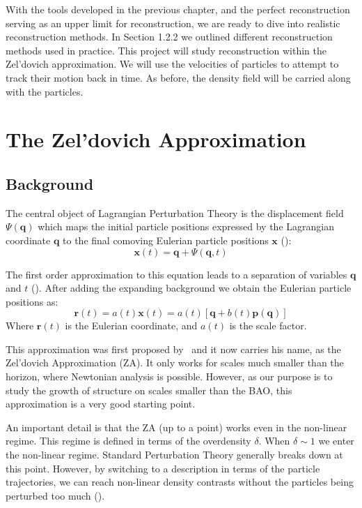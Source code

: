 
With the tools developed in the previous chapter, and the perfect reconstruction serving as an upper limit for reconstruction, we are ready to dive into realistic reconstruction methods. In Section 1.2.2 we outlined different reconstruction methods used in practice. This project will study reconstruction within the Zel'dovich approximation. We will use the velocities of particles to attempt to track their motion back in time. As before, the density field will be carried along with the particles.

\section{The Zel'dovich Approximation}

\subsection{Background}

The central object of Lagrangian Perturbation Theory is the displacement field $\Psi(\textbf{q})$ which maps the initial particle positions expressed by the Lagrangian coordinate $\textbf{q}$ to the final comoving Eulerian particle positions $\textbf{x}$ (\cite{Bernardeau_PT}):
\begin{equation}
     \textbf{x}(t) = \textbf{q} + \Psi(\textbf{q}, t)
\end{equation}

The first order approximation to this equation leads to a separation of variables $\textbf{q}$ and $t$ (\cite{1993sfu..book.....P}). After adding the expanding background we obtain the Eulerian particle positions as:
\begin{equation}
    \textbf{r}(t) = a(t) \textbf{x}(t) = a(t) [\textbf{q} + b(t) \textbf{p}(\textbf{q})]
    \label{eq:2.2}
\end{equation}
Where $\textbf{r}(t)$ is the Eulerian coordinate, and $a(t)$ is the scale factor.

This approximation was first proposed by~\cite{1970A&A.....5...84Z} and it now carries his name, as the Zel'dovich Approximation (ZA). It only works for scales much smaller than the horizon, where Newtonian analysis is possible. However, as our purpose is to study the growth of structure on scales smaller than the BAO, this approximation is a very good starting point. 

An important detail is that the ZA (up to a point) works even in the non-linear regime. This regime is defined in terms of the overdensity $\delta$. When $\delta \sim 1$ we enter the non-linear regime. Standard Perturbation Theory generally breaks down at this point. However, by switching to a description in terms of the particle trajectories, we can reach non-linear density contrasts without the particles being perturbed too much (\cite{1993sfu..book.....P}).

